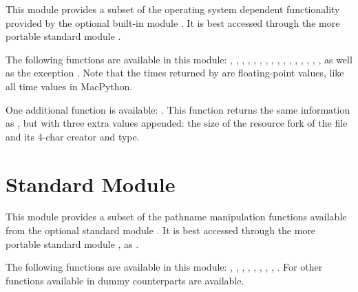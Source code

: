 This module provides a subset of the operating system dependent
functionality provided by the optional built-in module .
It is best accessed through the more portable standard module
.

The following functions are available in this module:
,
,
,
,
,
,
,
,
,
,
,
,
,
,
,
,
as well as the exception . Note that the times
returned by  are floating-point values, like all time
values in MacPython.

One additional function is available: . This function
returns the same information as , but with three extra
values appended: the size of the resource fork of the file and its
4-char creator and type.

\section{Standard Module }
\label{module-macpath}

This module provides a subset of the pathname manipulation functions
available from the optional standard module .  It is
best accessed through the more portable standard module , as
.

The following functions are available in this module:
,
,
,
,
,
,
,
,
.
For other functions available in  dummy counterparts
are available.
